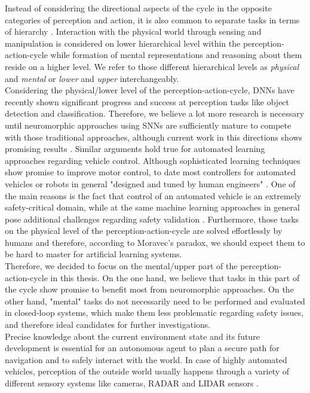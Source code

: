 Instead of considering the directional aspects of the cycle in the opposite categories of perception and action, it is also common to separate tasks in terms of hierarchy \cite{Loeb2014}.
Interaction with the physical world through sensing and manipulation is considered on lower hierarchical level within the perception-action-cycle while formation of mental representations and reasoning about them reside on a higher level. 
We refer to those different hierarchical levels as \emph{physical} and \emph{mental} or \emph{lower} and \emph{upper} interchangeably.\\
Considering the physical/lower level of the perception-action-cycle, \acp{DNN} have recently shown significant progress and success at perception tasks like object detection and classification.
Therefore, we believe a lot more research is necessary until neuromorphic approaches using \acp{SNN} are sufficiently mature to compete with those traditional approaches, although current work in this directions shows promising results \cite{Hunsberger2015}.
Similar arguments hold true for automated learning approaches regarding vehicle control.
Although sophisticated learning techniques show promise to improve motor control, to date most controllers for automated vehicles or robots in general "designed and tuned by human engineers" \cite{Deisenroth2013}.
One of the main reasons is the fact that control of an automated vehicle is an extremely safety-critical domain, while at the same machine learning approaches in general pose additional challenges regarding safety validation \cite{Koopman2016}.
Furthermore, those tasks on the physical level of the perception-action-cycle are solved effortlessly by humans and therefore, according to Moravec's paradox, we should expect them to be hard to master for artificial learning systems.\\
Therefore, we decided to focus on the mental/upper part of the perception-action-cycle in this thesis.
On the one hand, we believe that tasks in this part of the cycle show promise to benefit most from neuromorphic approaches. 
On the other hand, "mental" tasks do not necessarily need to be performed and evaluated in closed-loop systems, which make them less problematic regarding safety issues, and therefore ideal candidates for further investigations.\\
Precise knowledge about the current environment state and its future development is essential for an autonomous agent to plan a secure path for navigation and to safely interact with the world. 
In case of highly automated vehicles, perception of the outside world usually happens through a variety of different sensory systems like cameras, \acs{RADAR} and \acs{LIDAR} sensors \cite{Aeberhard2015}. 
